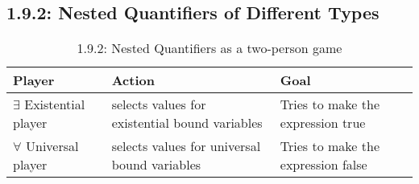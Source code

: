 \documentclass{article}
\begin{document}
\subsection*{1.9.2: Nested Quantifiers of Different Types}
\begin{table}[!htb]
    \caption{1.9.2: Nested Quantifiers as a two-person game}
    \begin{minipage}{1.0\linewidth}
      \label{tab:table_label}
      \begin{center}
        \begin{tabular}{ l | l | l }
            \textbf{Player} & \textbf{Action} & \textbf{Goal} \\ \hline
           $\exists$ Existential player  & selects values for existential bound variables & Tries to make the expression true \\
           $\forall$ Universal player & selects values for universal bound variables & Tries to make the expression false \\      
        \end{tabular}
    \end{center}
    \end{minipage}%
\end{table}
\end{document}
